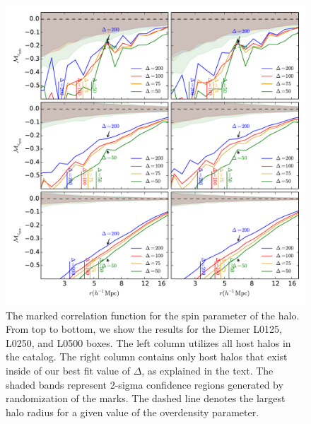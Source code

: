\documentclass[usenatbib,usegraphicx,letterpaper]{mn2e}
\begin{document}
\begin{figure}
	\centering
	\includegraphics[width=\textwidth]{all_mcf_spin_z00_hostsvmatch.pdf}
	\caption{The marked correlation function for the spin parameter of the halo. From top to bottom, we show the results for the Diemer L0125, L0250, and L0500 boxes. The left column utilizes all host halos in the catalog. The right column contains only host halos that exist inside of our best fit value of $\Delta$, as explained in the text. The shaded bands represent 2-sigma confidence regions generated by randomization of the marks. The dashed line denotes the largest halo radius for a given value of the overdensity parameter.}
\end{figure}
\end{document}

